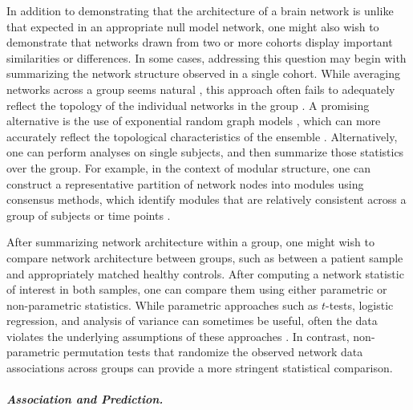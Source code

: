 \documentclass[12pt]{article}
\begin{document}
In addition to demonstrating that the architecture of a brain network is unlike that expected in an appropriate null model network, one might also wish to demonstrate that networks drawn from two or more cohorts display important similarities or differences. In some cases, addressing this question may begin with summarizing the network structure observed in a single cohort. While averaging networks across a group seems natural \cite{Achard2006,Song2009,Zuo2012}, this approach often fails to adequately reflect the topology of the individual networks in the group \cite{Simpson2012}. A promising alternative is the use of exponential random graph models \cite{Newman2010}, which can more accurately reflect the topological characteristics of the ensemble \cite{Simpson2011,Simpson2012}. Alternatively, one can perform analyses on single subjects, and then summarize those statistics over the group. For example, in the context of modular structure, one can construct a representative partition of network nodes into modules using consensus methods, which identify modules that are relatively consistent across a group of subjects or time points \cite{Lancichinetti2012,Bassett2012b}. 

After summarizing network architecture within a group, one might wish to compare network architecture between groups, such as between a patient sample and appropriately matched healthy controls. After computing a network statistic of interest in both samples, one can compare them using either parametric or non-parametric statistics. While parametric approaches such as $t$-tests, logistic regression, and analysis of variance can sometimes be useful, often the data violates the underlying assumptions of these approaches \cite{snijders1999non}. In contrast, non-parametric permutation tests that randomize the observed network data associations across groups can provide a more stringent statistical comparison.

\paragraph{\emph{Association and Prediction.}}
\end{document}
